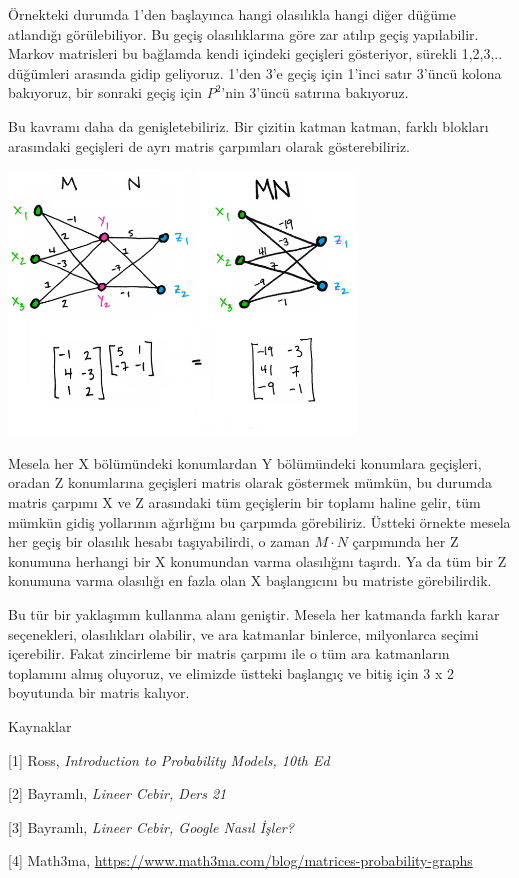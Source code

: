 \documentclass[12pt,fleqn]{article}\usepackage{../../common}
\begin{document}
Örnekteki durumda 1'den başlayınca hangi olasılıkla hangi diğer düğüme atlandığı
görülebiliyor. Bu geçiş olasılıklarına göre zar atılıp geçiş yapılabilir.
Markov matrisleri bu bağlamda kendi içindeki geçişleri gösteriyor, sürekli
1,2,3,.. düğümleri arasında gidip geliyoruz. 1'den 3'e geçiş için 1'inci satır
3'üncü kolona bakıyoruz, bir sonraki geçiş için $P^2$'nin 3'üncü satırına
bakıyoruz.

Bu kavramı daha da genişletebiliriz. Bir çizitin katman katman, farklı blokları
arasındaki geçişleri de ayrı matris çarpımları olarak gösterebiliriz.

\includegraphics[width=25em]{stat_093_mc_02.png}

Mesela her X bölümündeki konumlardan Y bölümündeki konumlara geçişleri, oradan Z
konumlarına geçişleri matris olarak göstermek mümkün, bu durumda matris çarpımı
X ve Z arasındaki tüm geçişlerin bir toplamı haline gelir, tüm mümkün gidiş
yollarının ağırlığını bu çarpımda görebiliriz. Üstteki örnekte mesela her geçiş
bir olasılık hesabı taşıyabilirdi, o zaman $M \cdot N$ çarpımında her Z konumuna
herhangi bir X konumundan varma olasılığını taşırdı. Ya da tüm bir Z konumuna
varma olasılığı en fazla olan X başlangıcını bu matriste görebilirdik.

Bu tür bir yaklaşımın kullanma alanı geniştir. Mesela her katmanda farklı karar
seçenekleri, olasılıkları olabilir, ve ara katmanlar binlerce, milyonlarca
seçimi içerebilir. Fakat zincirleme bir matris çarpımı ile o tüm ara katmanların
toplamını almış oluyoruz, ve elimizde üstteki başlangıç ve bitiş için 3 x 2
boyutunda bir matris kalıyor.

Kaynaklar

[1] Ross, {\em Introduction to Probability Models, 10th Ed}

[2] Bayramlı, {\em Lineer Cebir, Ders 21}

[3] Bayramlı, {\em Lineer Cebir, Google Nasıl İşler?}

[4] Math3ma, \url{https://www.math3ma.com/blog/matrices-probability-graphs}
\end{document}
